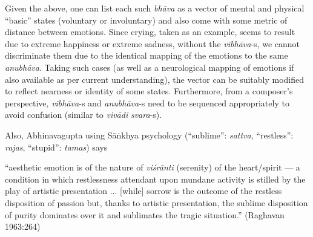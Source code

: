 Given the above, one can list each such \textsl{bhāva} as a vector of mental and physical “basic” states (voluntary or involuntary) and also come with some metric of distance between emotions. Since crying, taken as an example, seems to result due to extreme happiness or extreme sadness, without the \textsl{vibhāva}-s, we cannot discriminate them due to the identical mapping of the emotions to the same \textsl{anubhāva}. Taking such cases (as well as a neurological mapping of emotions if also available as per current understanding), the vector can be suitably modified to reflect nearness or identity of some states. Furthermore, from a composer’s perspective, \textsl{vibhāva}-s and \textsl{anubhāva}-s need to be sequenced appropriately to avoid confusion (similar to \textsl{vivādi} \textsl{svara}-s).

\newpage

Also, Abhinavagupta using Sāṅkhya psychology (“sublime”: \textsl{sattva}, “restless”: \textsl{rajas}, “stupid”: \textsl{tamas}) says

\begin{myquote}
“aesthetic emotion is of the nature of \textsl{viśrānti} (serenity) of the heart/spirit --- a condition in which restlessness attendant upon mundane activity is stilled by the play of artistic presentation ... [while] sorrow is the outcome of the restless disposition of passion but, thanks to artistic presentation, the sublime disposition of purity dominates over it and sublimates the tragic situation.” 
\hfill(Raghavan 1963:264)
\end{myquote}

